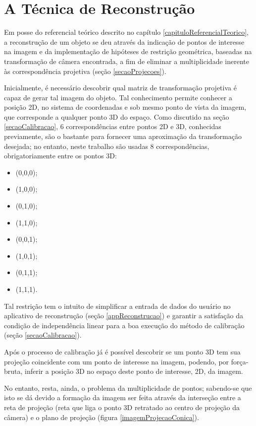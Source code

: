 \chapter{A Técnica de Reconstrução}
	\label{capituloReconstrucao}

Em posse do referencial teórico descrito no capítulo \ref{capituloReferencialTeorico}, a reconstrução de um objeto se deu através da indicação de pontos de interesse na imagem e da implementação de hipóteses de restrição geométrica, baseadas na transformação de câmera encontrada, a fim de eliminar a multiplicidade inerente às correspondência projetiva (seção \ref{secaoProjecoes}).

	Inicialmente, é necessário descobrir qual matriz de transformação projetiva é capaz de gerar tal imagem do objeto. Tal conhecimento permite conhecer a posição 2D, no sistema de coordenadas e sob mesmo ponto de vista da imagem, que corresponde a qualquer ponto 3D do espaço. Como discutido na seção \ref{secaoCalibracao}, 6 correspondências entre pontos 2D e 3D, conhecidas previamente, são o bastante para fornecer uma aproximação da transformação desejada; no entanto, neste trabalho são usadas 8 correspondências, obrigatoriamente entre os pontos 3D:
	\begin{itemize}
		\item (0,0,0);
		\item (1,0,0);
		\item (0,1,0);
		\item (1,1,0);
		\item (0,0,1);
		\item (1,0,1);
		\item (0,1,1);
		\item (1,1,1).
	\end{itemize}
	Tal restrição tem o intuito de simplificar a entrada de dados do usuário no aplicativo de reconstrução (seção \ref{appReconstrucao}) e garantir a satisfação da condição de independência linear para a boa execução do método de calibração (seção \ref{secaoCalibracao}).
	
	Após o processo de calibração já é possível descobrir se um ponto 3D tem sua projeção coincidente com um ponto de interesse na imagem, podendo, por força-bruta, inferir a posição 3D no espaço deste ponto de interesse, 2D, da imagem. 
	
	No entanto, resta, ainda, o problema da multiplicidade de pontos; sabendo-se que isto se dá devido a formação da imagem ser feita através da interseção entre a reta de projeção (reta que liga o ponto 3D retratado ao centro de projeção da câmera) e o plano de projeção (figura \ref{imagemProjecaoConica}).
	
